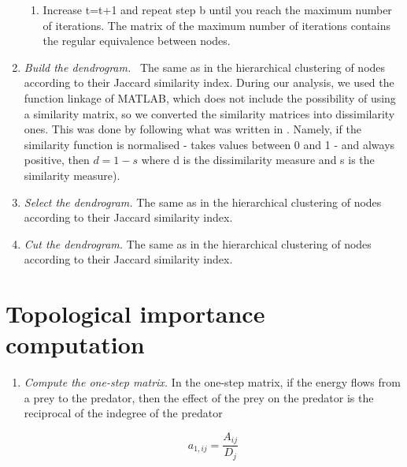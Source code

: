 \documentclass[twocolumn]{article}
\begin{document}
\begin{appendices}
\begin{enumerate}
\begin{enumerate}
					      \item Increase t=t+1 and repeat step b until you reach the maximum number of iterations. The matrix of the maximum number of iterations contains the regular equivalence between nodes.

				      \end{enumerate}

			\item \emph{Build the dendrogram.} \smallskip \
			The same as in the hierarchical clustering of nodes according to their Jaccard similarity index. During our analysis, we used the function linkage of MATLAB, which does not include the possibility of using a similarity matrix, so we converted the similarity matrices into dissimilarity ones. This was done by following what was written in \citet{VonLuxburg2004}. Namely, if the similarity function is normalised - takes values between 0 and 1 - and always positive, then $d=1-s$ where d is the dissimilarity measure and s is the similarity measure).

			\item \emph{Select the dendrogram.} \smallskip \newline
			The same as in the hierarchical clustering of nodes according to their Jaccard similarity index.

			\item \emph{Cut the dendrogram.} \smallskip \newline
			The same as in the hierarchical clustering of nodes according to their Jaccard similarity index.

		\end{enumerate}

	\section{Topological importance computation} \label{appendix:TI}

		\begin{enumerate}

			\item \emph{Compute the one-step matrix.} \smallskip \newline
			In the one-step matrix, if the energy flows from a prey to the predator, then the effect of the prey on the predator is the reciprocal of the indegree of the predator

								\begin{equation}
									a_{1,ij}=\frac{A_{ij}}{D_j}
								\end{equation}


\end{enumerate}
\end{appendices}
\end{document}

